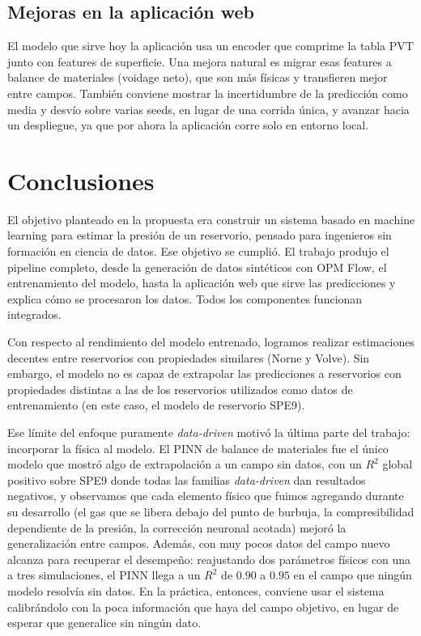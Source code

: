 \documentclass[12pt,a4paper]{article}
\begin{document}
\subsection{Mejoras en la aplicación web}

El modelo que sirve hoy la aplicación usa un encoder que comprime la tabla PVT junto con
features de superficie. Una mejora natural es migrar esas features a balance de materiales
(voidage neto), que son más físicas y transfieren mejor entre campos. También conviene
mostrar la incertidumbre de la predicción como media y desvío sobre varias seeds, en
lugar de una corrida única, y avanzar hacia un despliegue, ya que por ahora la aplicación
corre solo en entorno local.

\newpage
\section{Conclusiones}

El objetivo planteado en la propuesta era construir un sistema basado en machine
learning para estimar la presión de un reservorio, pensado para ingenieros sin formación
en ciencia de datos. Ese objetivo se cumplió. El trabajo produjo el pipeline completo,
desde la generación de datos sintéticos con OPM Flow, el entrenamiento del modelo, 
hasta la aplicación web que sirve las predicciones y explica cómo se procesaron los datos. Todos los componentes funcionan integrados.

Con respecto al rendimiento del modelo entrenado, logramos realizar estimaciones decentes
entre reservorios con propiedades similares (Norne y Volve). Sin embargo, el modelo no es capaz
de extrapolar las predicciones a reservorios con propiedades distintas a las de los reservorios
utilizados como datos de entrenamiento (en este caso, el modelo de reservorio SPE9).

Ese límite del enfoque puramente \textit{data-driven} motivó la última parte del
trabajo: incorporar la física al modelo. El PINN de balance de materiales fue el único
modelo que mostró algo de extrapolación a un campo sin datos, con un $R^2$ global
positivo sobre SPE9 donde todas las familias \textit{data-driven} dan resultados
negativos, y observamos que cada elemento físico que fuimos agregando durante su
desarrollo (el gas que se libera debajo del punto de burbuja, la compresibilidad
dependiente de la presión, la corrección neuronal acotada) mejoró la generalización
entre campos. Además, con muy pocos datos del campo nuevo alcanza para recuperar el
desempeño: reajustando dos parámetros físicos con una a tres simulaciones, el PINN llega
a un $R^2$ de $0.90$ a $0.95$ en el campo que ningún modelo resolvía sin datos. En la
práctica, entonces, conviene usar el sistema calibrándolo con la poca información que
haya del campo objetivo, en lugar de esperar que generalice sin ningún dato.
\end{document}
